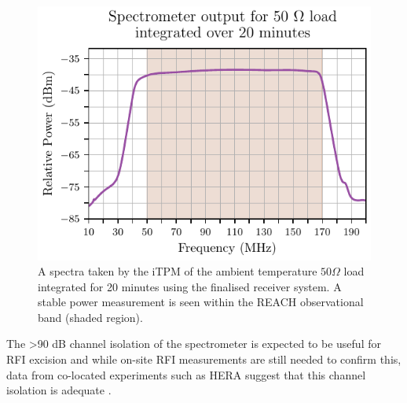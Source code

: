 \begin{figure}
    \centering
    \includegraphics{psd_cold}
    \caption{A spectra taken by the iTPM of the ambient temperature $50 \Omega$ load integrated for 20 minutes using the finalised receiver system. A stable power measurement is seen within the REACH observational band (shaded region).}
    \label{fig:psd_cold}
\end{figure}
The >90 dB channel isolation of the spectrometer is expected to be useful for RFI excision \citep{itpm} and while on-site RFI measurements are still needed to confirm this, data from co-located experiments such as HERA suggest that this channel isolation is adequate \citep{hera}.


